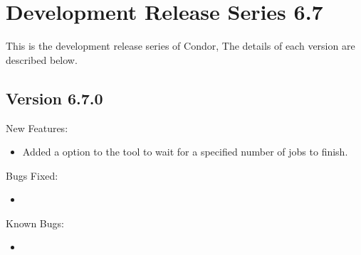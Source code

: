 \section{\label{sec:History-6-7}Development Release Series 6.7}

This is the development release series of Condor,
The details of each version are described below.

\subsection{\label{sec:New-6-7-0}Version 6.7.0}

\noindent New Features:

\begin{itemize}

  \item Added a  option to the  tool to wait for
      a specified number of jobs to finish.

\end{itemize}

\noindent Bugs Fixed:

\begin{itemize}
  \item
\end{itemize}

\noindent Known Bugs:

\begin{itemize}
  \item
\end{itemize}
